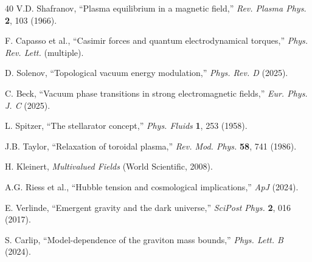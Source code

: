 \documentclass[preprint,12pt]{elsarticle}
\begin{document}
\begin{thebibliography}{40}
V.D. Shafranov, ``Plasma equilibrium in a magnetic field,'' \textit{Rev. Plasma Phys.} \textbf{2}, 103 (1966).

F. Capasso et al., ``Casimir forces and quantum electrodynamical torques,'' \textit{Phys. Rev. Lett.} (multiple).

D. Solenov, ``Topological vacuum energy modulation,'' \textit{Phys. Rev. D} (2025).

C. Beck, ``Vacuum phase transitions in strong electromagnetic fields,'' \textit{Eur. Phys. J. C} (2025).

L. Spitzer, ``The stellarator concept,'' \textit{Phys. Fluids} \textbf{1}, 253 (1958).

J.B. Taylor, ``Relaxation of toroidal plasma,'' \textit{Rev. Mod. Phys.} \textbf{58}, 741 (1986).

H. Kleinert, \textit{Multivalued Fields} (World Scientific, 2008).

A.G. Riess et al., ``Hubble tension and cosmological implications,'' \textit{ApJ} (2024).

E. Verlinde, ``Emergent gravity and the dark universe,'' \textit{SciPost Phys.} \textbf{2}, 016 (2017).

S. Carlip, ``Model-dependence of the graviton mass bounds,'' \textit{Phys. Lett. B} (2024).

\end{thebibliography}
\end{document}
